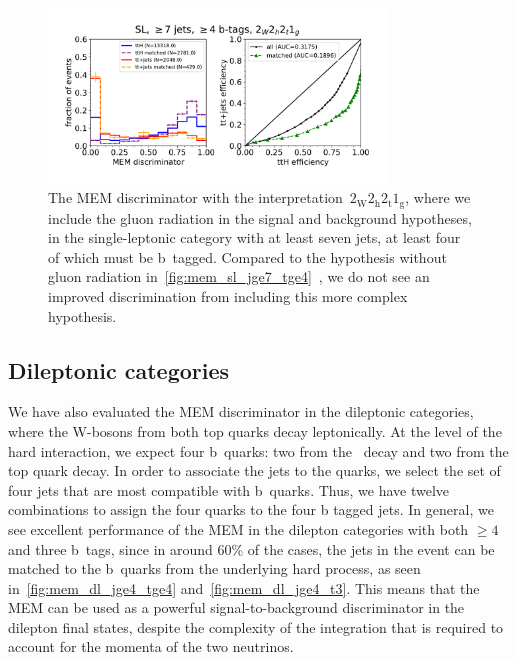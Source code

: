 \begin{figure}[ht]
\begin{centering}
\includegraphics[width = 0.8\textwidth]{figures/mem/mem_sl_jge7_tge4_1g.pdf}
\caption[MEM with the~$2_{\mathrm{W}} 2_{\mathrm{h}} 2_{\mathrm{t}} 1_{\mathrm{g}}$ interpretation in the $\ge7$ jet, $\ge4$ b~tag category]{The MEM discriminator with the interpretation~$2_{\mathrm{W}} 2_{\mathrm{h}} 2_{\mathrm{t}} 1_{\mathrm{g}}$, where we include the gluon radiation in the signal and background hypotheses, in the single-leptonic category with at least seven jets, at least four of which must be b~tagged. Compared to the hypothesis without gluon radiation in~\cref{fig:mem_sl_jge7_tge4}~, we do not see an improved discrimination from including this more complex hypothesis.}
\label{fig:mem_sl_jge7_tge4_7jet}
\end{centering}
\end{figure}

\subsection{Dileptonic categories}
We have also evaluated the MEM discriminator in the dileptonic categories, where the W-bosons from both top quarks decay leptonically. At the level of the hard interaction, we expect four b~quarks: two from the \Hbb~decay and two from the top quark decay. In order to associate the jets to the quarks, we select the set of four jets that are most compatible with b~quarks. Thus, we have twelve combinations to assign the four quarks to the four b tagged jets. In general, we see excellent performance of the MEM in the dilepton categories with both $\geq4$ and three b~tags, since in around 60\% of the cases, the jets in the event can be matched to the b~quarks from the underlying hard process, as seen in~\cref{fig:mem_dl_jge4_tge4} and~\cref{fig:mem_dl_jge4_t3}. This means that the MEM can be used as a powerful signal-to-background discriminator in the dilepton final states, despite the complexity of the integration that is required to account for the momenta of the two neutrinos.


